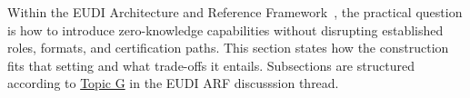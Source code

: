 


Within the EUDI Architecture and Reference Framework~\cite{EU:EUDI23}, the practical question is how to introduce zero-knowledge capabilities without disrupting established roles, formats, and certification paths. 
This section states how the construction fits that setting and what trade-offs it entails. 
Subsections are structured according to \href{https://github.com/eu-digital-identity-wallet/eudi-doc-architecture-and-reference-framework/blob/main/docs/discussion-topics/g-zero-knowledge-proof.md}{Topic G} in the EUDI ARF discusssion thread.


